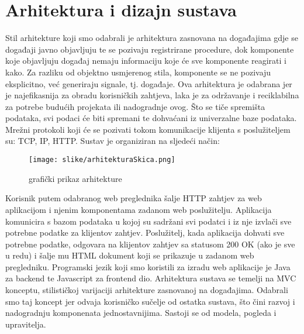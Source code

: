 \chapter{Arhitektura i dizajn sustava}
		


	Stil arhitekture koji smo odabrali je arhitektura zasnovana na događajima gdje se događaji javno objavljuju te se pozivaju registrirane procedure, dok komponente koje objavljuju događaj nemaju informaciju koje će sve komponente reagirati i kako. Za razliku od objektno usmjerenog stila, komponente se ne pozivaju eksplicitno, već generiraju signale, tj. događaje. Ova arhitektura je odabrana jer je najefikasnija za obradu korisničkih zahtjeva, laka je za održavanje i reciklabilna za potrebe budućih projekata ili nadogradnje ovog. Što se tiče spremišta podataka, svi podaci će biti spremani te dohvaćani iz univerzalne baze podataka. Mrežni protokoli koji će se pozivati tokom komunikacije klijenta s poslužiteljem su: TCP, IP, HTTP. 
Sustav je organiziran na sljedeći način: 
\begin{figure}[H]
			\texttt{[image: slike/arhitekturaSkica.png]} %
			\caption{grafički prikaz arhitekture}
			\label{fig:arhitektura} %
			\end{figure}
Korisnik putem odabranog web preglednika šalje HTTP zahtjev za web aplikacijom i njenim komponentama zadanom web poslužitelju. Aplikacija komunicira s bazom podataka u kojoj su sadržani svi podatci i iz nje izvlači sve potrebne podatke za klijentov zahtjev. Poslužitelj, kada aplikacija dohvati sve potrebne podatke, odgovara na klijentov zahtjev sa statusom 200 OK (ako je sve u redu) i šalje mu HTML dokument koji se prikazuje u zadanom web pregledniku.
Programski jezik koji smo koristili za izradu web aplikacije je Java za backend te Javascript za frontend dio.
Arhitektura sustava se temelji na MVC konceptu, stilističkoj varijaciji arhitekture zasnovanoj na događajima. Odabrali smo taj koncept jer odvaja korisničko sučelje od ostatka sustava, što čini razvoj i nadogradnju komponenata jednostavnijima. Sastoji se od modela, pogleda i upravitelja.
		

